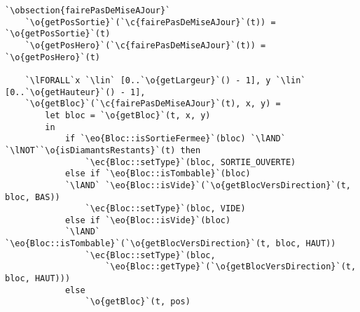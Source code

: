 \documentclass{article}
\newcommand{\lAND}{$\land$}
\newcommand{\lNOT}{$\lnot$}
\newcommand{\lFORALL}{$\forall$}
\newcommand{\lin}{$\in$}
\newcommand{\obsection}[1]{\textbf{[#1]}}
\renewcommand{\o}[1]{\textcolor{blue}{#1}}
\renewcommand{\c}[1]{\textcolor{red}{#1}}
\newcommand{\eo}[1]{\textcolor{RoyalPurple}{#1}}
\newcommand{\ec}[1]{\textcolor{BrickRed}{#1}}
\begin{document}
\begin{lstlisting}[caption=Terrain]
`\obsection{fairePasDeMiseAJour}`
	`\o{getPosSortie}`(`\c{fairePasDeMiseAJour}`(t)) = `\o{getPosSortie}`(t)
	`\o{getPosHero}`(`\c{fairePasDeMiseAJour}`(t)) = `\o{getPosHero}`(t)
	
	`\lFORALL`x `\lin` [0..`\o{getLargeur}`() - 1], y `\lin` [0..`\o{getHauteur}`() - 1],
	`\o{getBloc}`(`\c{fairePasDeMiseAJour}`(t), x, y) =
		let bloc = `\o{getBloc}`(t, x, y)
		in
			if `\eo{Bloc::isSortieFermee}`(bloc) `\lAND` `\lNOT``\o{isDiamantsRestants}`(t) then
				`\ec{Bloc::setType}`(bloc, SORTIE_OUVERTE)
			else if `\eo{Bloc::isTombable}`(bloc)
			`\lAND` `\eo{Bloc::isVide}`(`\o{getBlocVersDirection}`(t, bloc, BAS))
				`\ec{Bloc::setType}`(bloc, VIDE)
			else if `\eo{Bloc::isVide}`(bloc)
			`\lAND` `\eo{Bloc::isTombable}`(`\o{getBlocVersDirection}`(t, bloc, HAUT))
				`\ec{Bloc::setType}`(bloc,
					`\eo{Bloc::getType}`(`\o{getBlocVersDirection}`(t, bloc, HAUT)))
			else
				`\o{getBloc}`(t, pos)
\end{lstlisting}
\clearpage
\end{document}
